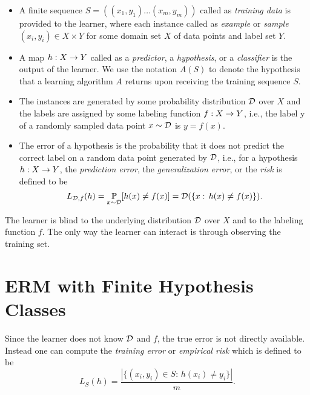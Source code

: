 \documentclass[11pt,a4paper]{article}
\begin{document}
\begin{itemize}
    \item {} A finite sequence $S = ((x_1,y_1)\ldots(x_m,y_m))$ called as \textit{training data} is provided to the learner, where each instance called as \textit{example} or \textit{sample} $(x_i,y_i)\in X\times Y$ for some domain set $X$ of data points and label set $Y$.
    \item {} A map $h:X\rightarrow Y$ called as a \textit{predictor}, a \textit{hypothesis}, or a \textit{classifier} is the output of the learner. We use the notation $A(S)$ to denote the hypothesis that a learning algorithm $A$ returns upon receiving the training sequence $S$.
    \item {} The instances are generated by some probability distribution $\mathcal{D}$ over $X$ and the labels are assigned by some labeling function $f:X\rightarrow Y$, i.e., the label y of a randomly sampled data point $x\sim \mathcal{D}$ is $y = f(x).$
    \item {} The error of a hypothesis is the probability that it does not predict the correct label on a random data point generated by $\mathcal{D}$, i.e., for a hypothesis $h:X\rightarrow Y$, the \textit{prediction error}, the \textit{generalization error}, or the \textit{risk} is defined to be
    \begin{equation}
    L_{\mathcal{D}, f}(h) = \underset{x\sim \mathcal{D}}{\mathbb{P}} [h(x)\neq f(x)] = \mathcal{D} (\{x:\,h(x)\neq f(x)\}).
    \end{equation}
\end{itemize}

\begin{remark}
The learner is blind to the underlying distribution $\mathcal{D}$ over $X$ and to the labeling function $f$. The only way the learner can interact is through observing the training set.
\end{remark}

\section{ERM with Finite Hypothesis Classes}

Since the learner does not know $\mathcal{D}$ and $f$, the true error is not directly available. Instead one can compute the \textit{training error} or \textit{empirical risk} which is defined to be
\begin{equation}
L_S(h) = \dfrac{|\{(x_i,y_i)\in S:\,h(x_i)\neq y_i\}|}{m}.
\end{equation}
\end{document}
